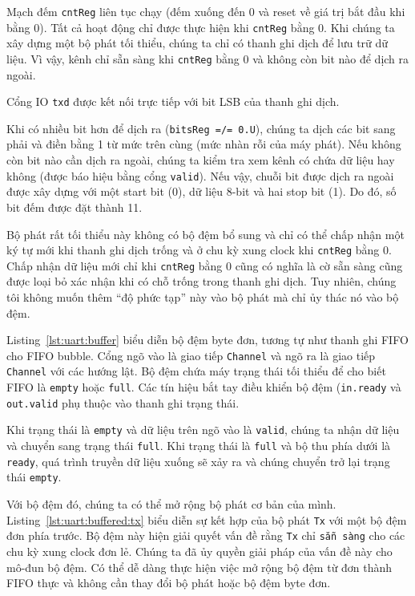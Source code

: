 \documentclass[%
    10pt,
    headinclude, footexclude,
    openright, %
    notitlepage,
    cleardoubleempty,
    headsepline,
    pointlessnumbers,
    bibtotoc, idxtotoc,
    ]{scrbook}
\newcommand{\code}[1]{{\small{\texttt{#1}}}}
\begin{document}
Mạch đếm \code{cntReg} liên tục chạy (đếm xuống đến 0 và reset về giá trị bắt đầu khi bằng 0). Tất cả hoạt động chỉ được thực hiện khi \code{cntReg} bằng 0. Khi chúng ta xây dựng một bộ phát tối thiểu, chúng ta chỉ có thanh ghi dịch để lưu trữ dữ liệu. Vì vậy, kênh chỉ sẵn sàng khi \code{cntReg} bằng 0 và không còn bit nào để dịch ra ngoài.

Cổng IO \code{txd} được kết nối trực tiếp với bit LSB của thanh ghi dịch. 

Khi có nhiều bit hơn để dịch ra (\code{bitsReg =/= 0.U}), chúng ta dịch các bit sang phải và điền bằng 1 từ mức trên cùng (mức nhàn rỗi của máy phát). Nếu không còn bit nào cần dịch ra ngoài, chúng ta kiểm tra xem kênh có chứa dữ liệu hay không (được báo hiệu bằng cổng \code{valid}). Nếu vậy, chuỗi bit được dịch ra ngoài được xây dựng với một start bit (0), dữ liệu 8-bit và hai stop bit (1). Do đó, số bit đếm được đặt thành 11.

Bộ phát rất tối thiểu này không có bộ đệm bổ sung và chỉ có thể chấp nhận một ký tự mới khi thanh ghi dịch trống và ở chu kỳ xung clock khi \code{cntReg} bằng 0. Chấp nhận dữ liệu mới chỉ khi \code{cntReg} bằng 0 cũng có nghĩa là cờ sẵn sàng cũng được loại bỏ xác nhận khi có chỗ trống trong thanh ghi dịch. Tuy nhiên, chúng tôi không muốn thêm ``độ phức tạp'' này vào bộ phát mà chỉ ủy thác nó vào bộ đệm. 


Listing~\ref{lst:uart:buffer} biểu diễn bộ đệm byte đơn, tương tự như thanh ghi FIFO cho FIFO bubble. Cổng ngõ vào là giao tiếp \code{Channel} và ngõ ra là giao tiếp \code{Channel} với các hướng lật. Bộ đệm chứa máy trạng thái tối thiểu để cho biết FIFO là \code{empty} hoặc \code{full}. Các tín hiệu bắt tay điều khiển bộ đệm (\code{in.ready} và \code{out.valid} phụ thuộc vào thanh ghi trạng thái.

Khi trạng thái là \code{empty} và dữ liệu trên ngõ vào là \code{valid}, chúng ta nhận dữ liệu và chuyển sang trạng thái \code{full}. Khi trạng thái là \code{full} và bộ thu phía dưới là \code{ready}, quá trình truyền dữ liệu xuống sẽ xảy ra và chúng chuyển trở lại trạng thái \code{empty}. 


Với bộ đệm đó, chúng ta có thể mở rộng bộ phát cơ bản của mình. Listing~\ref{lst:uart:buffered:tx} biểu diễn sự kết hợp của bộ phát \code{Tx} với một bộ đệm đơn phía trước. Bộ đệm này hiện giải quyết vấn đề rằng \code{Tx} chỉ \code {sẵn sàng} cho các chu kỳ xung clock đơn lẻ. Chúng ta đã ủy quyền giải pháp của vấn đề này cho mô-đun bộ đệm. Có thể dễ dàng thực hiện việc mở rộng bộ đệm từ đơn thành FIFO thực và không cần thay đổi bộ phát hoặc bộ đệm byte đơn.
\end{document}
